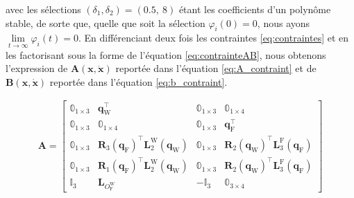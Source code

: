 avec les sélections $(\delta_{1}, \delta_{2}) = (0.5,~8)$ étant les coefficients d'un polynôme stable, de sorte que, quelle que soit la sélection $\varphi_{i}(0) = 0$, nous ayons $\lim\limits_{t \to \infty} \varphi_{i}(t) = 0$. En différenciant deux fois les contraintes \eqref{eq:contraintes} et en les factorisant sous la forme de l'équation \eqref{eq:contrainteAB}, nous obtenons l'expression de $\boldsymbol{A}(\boldsymbol{x},\dot{\boldsymbol{x}})$ reportée dans l'équation \eqref{eq:A_contraint} et de $\boldsymbol{B}(\boldsymbol{x},\dot{\boldsymbol{x}})$ reportée dans l'équation \eqref{eq:b_contraint}.

\begin{align}
\label{eq:A_contraint}
\boldsymbol{A} = \begin{bmatrix}
            \mathbb{0}_{1 \times 3} & \boldsymbol{q}_{\text{W}}^\top & \mathbb{0}_{1 \times 3} & \mathbb{0}_{1 \times 4}\\
            \mathbb{0}_{1 \times 3} & \mathbb{0}_{1 \times 4} & \mathbb{0}_{1 \times 3} & \boldsymbol{q}_{\text{F}}^\top\\
            \mathbb{0}_{1 \times 3} & \boldsymbol{R}_{3}(\boldsymbol{q}_{\text{F}})^\top \boldsymbol{L}_{2}^{\text{W}}( \boldsymbol{q}_{\text{W}} ) & \mathbb{0}_{1 \times 3} & \boldsymbol{R}_{2}(\boldsymbol{q}_{\text{W}})^\top \boldsymbol{L}_{3}^{\text{F}}( \boldsymbol{q}_{\text{F}} ) \\
            \mathbb{0}_{1 \times 3} & \boldsymbol{R}_{1}(\boldsymbol{q}_{\text{F}})^\top \boldsymbol{L}_{2}^{\text{W}}( \boldsymbol{q}_{\text{W}} ) & \mathbb{0}_{1 \times 3} & \boldsymbol{R}_{2}(\boldsymbol{q}_{\text{W}})^\top \boldsymbol{L}_{3}^{\text{F}}( \boldsymbol{q}_{\text{F}} ) \\
            \mathbb{I}_{3} & \boldsymbol{L}_{O_{\text{F}}^{\text{W}}} & -\mathbb{I}_{3} & \mathbb{0}_{3 \times 4}
        \end{bmatrix}
\end{align}

